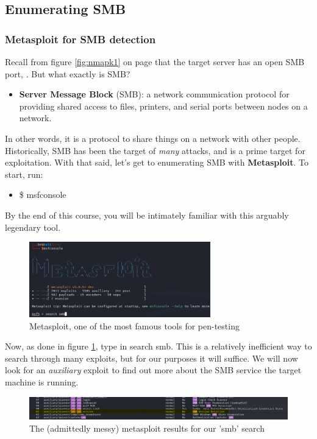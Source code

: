 \documentclass[a4paper,11pt]{article}
\renewcommand{\tt}[2][tt]{\textcolor{#1}{\ttfamily #2}}%
\begin{document}
\subsection{Enumerating SMB}
\subsubsection{Metasploit for SMB detection}

Recall from figure \ref{fig:nmapk1} on page \pageref{fig:nmapk1} that the target server has an open SMB port, \tt{139}. But what exactly is SMB?
\begin{itemize}
    \item {\bfseries Server Message Block} (SMB): a network communication protocol for providing shared access to files, printers, and serial ports between nodes on a network.
\end{itemize}
In other words, it is a protocol to share things on a network with other people. Historically, SMB has been the target of \textit{many} attacks, and is a prime target for exploitation. With that said, let's get to enumerating SMB with {\bfseries Metasploit}. To start, run:
\begin{itemize}
    \item \tt{\$ msfconsole}
\end{itemize}
By the end of this course, you will be intimately familiar with this arguably legendary tool.

\begin{figure}[h]
    \centering
    \includegraphics[width=0.7\textwidth]{images/metasploit.png}
    \caption{Metasploit, one of the most famous tools for pen-testing}
    \label{fig:metasploit}
\end{figure}

Now, as done in figure \ref{fig:metasploit}, type in \tt{search smb}. This is a relatively inefficient way to search through many exploits, but for our purposes it will suffice. We will now look for an \textit{auxiliary} exploit to find out more about the SMB service the target machine is running.

\begin{figure}[h]
    \centering
    \includegraphics[width=1\textwidth]{images/metasploitsmbsearch.png}
    \caption{The (admittedly messy) metasploit results for our '\tt{smb}' search}
    \label{fig:metasploitsmbsearch}
\end{figure}
\end{document}
